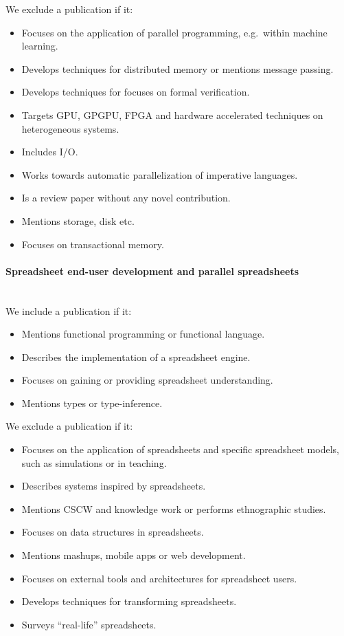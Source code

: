 \documentclass[a4paper]{article}
\begin{document}
We exclude a publication if it:

\begin{itemize}
\item Focuses on the application of parallel programming, e.g.\ within
  machine learning.
\item Develops techniques for distributed memory or mentions message
  passing.
\item Develops techniques for focuses on formal verification.
\item Targets GPU, GPGPU, FPGA and hardware accelerated techniques on
  heterogeneous systems.
\item Includes I/O.
\item Works towards automatic parallelization of imperative languages.
\item Is a review paper without any novel contribution.
\item Mentions storage, disk etc.
\item Focuses on transactional memory.
\end{itemize}

\paragraph{Spreadsheet end-user development and parallel spreadsheets}
~\\

We include a publication if it:

\begin{itemize}
\item Mentions functional programming or functional language.
\item Describes the implementation of a spreadsheet engine.
\item Focuses on gaining or providing spreadsheet understanding.
\item Mentions types or type-inference.
\end{itemize}

We exclude a publication if it:

\begin{itemize}
\item Focuses on the application of spreadsheets and specific
  spreadsheet models, such as simulations or in teaching.
\item Describes systems inspired by spreadsheets.
\item Mentions CSCW and knowledge work or performs ethnographic
  studies.
\item Focuses on data structures in spreadsheets.
\item Mentions mashups, mobile apps or web development.
\item Focuses on external tools and architectures for spreadsheet
  users.
\item Develops techniques for transforming spreadsheets.
\item Surveys ``real-life'' spreadsheets.
\end{itemize}
\end{document}
